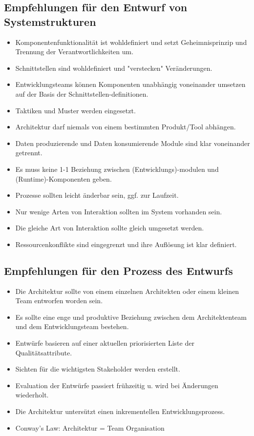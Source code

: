 \subsection{Empfehlungen für den Entwurf von Systemstrukturen}
\begin{itemize}
	\item Komponentenfunktionalität ist wohldefiniert und setzt Geheimnisprinzip und Trennung der Verantwortlichkeiten um.
	\item Schnittstellen sind wohldefiniert und "verstecken" Veränderungen.
	\item Entwicklungsteams können Komponenten unabhängig voneinander umsetzen auf der Basis der Schnittstellen-definitionen.
	\item Taktiken und Muster werden eingesetzt.
	\item Architektur darf niemals von einem bestimmten Produkt/Tool abhängen.
	\item Daten produzierende und Daten konsumierende Module sind klar voneinander getrennt.
	\item Es muss keine 1-1 Beziehung zwischen (Entwicklungs)-modulen und (Runtime)-Komponenten geben.
	\item Prozesse sollten leicht änderbar sein, ggf. zur Laufzeit.
	\item Nur wenige Arten von Interaktion sollten im System vorhanden sein.
	\item Die gleiche Art von Interaktion sollte gleich umgesetzt werden.
	\item Ressourcenkonflikte sind eingegrenzt und ihre Auflösung ist klar definiert.
\end{itemize}

\subsection{Empfehlungen für den Prozess des Entwurfs}
\begin{itemize}
	\item Die Architektur sollte von einem einzelnen Architekten oder einem kleinen Team entworfen worden sein.
	\item Es sollte eine enge und produktive Beziehung zwischen dem Architektenteam und dem Entwicklungsteam bestehen.
	\item Entwürfe basieren auf einer aktuellen priorisierten Liste der Qualitätsattribute.
	\item Sichten für die wichtigsten Stakeholder werden erstellt.
	\item Evaluation der Entwürfe passiert frühzeitig u. wird bei Änderungen wiederholt.
	\item Die Architektur untersützt einen inkrementellen Entwicklungsprozess.
	\item Conway's Law: Architektur = Team Organisation
\end{itemize}

